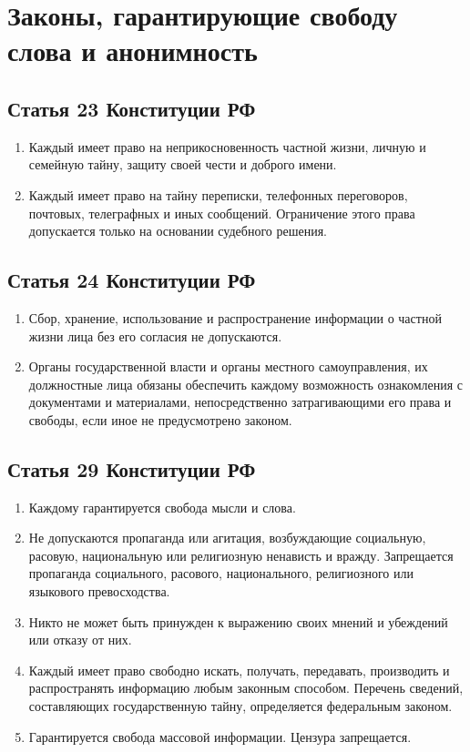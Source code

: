 \chapter{Законы, гарантирующие свободу слова и анонимность}
\section{Статья 23 Конституции РФ}
\begin{enumerate}
\item Каждый имеет право на неприкосновенность частной жизни, личную и семейную тайну, защиту своей чести и доброго имени.
\item Каждый имеет право на тайну переписки, телефонных переговоров, почтовых, телеграфных и иных сообщений. Ограничение этого права допускается только на основании судебного решения.
\end{enumerate}
\section{Статья 24 Конституции РФ}
\begin{enumerate}
\item Сбор, хранение, использование и распространение информации о частной жизни лица без его согласия не допускаются.
\item Органы государственной власти и органы местного самоуправления, их должностные лица обязаны обеспечить каждому возможность ознакомления с документами и материалами, непосредственно затрагивающими его права и свободы, если иное не предусмотрено законом.
\end{enumerate}
\section{Статья 29 Конституции РФ}
\begin{enumerate}
\item Каждому гарантируется свобода мысли и слова.
\item Не допускаются пропаганда или агитация, возбуждающие социальную, расовую, национальную или религиозную ненависть и вражду. Запрещается пропаганда социального, расового, национального, религиозного или языкового превосходства.
\item Никто не может быть принужден к выражению своих мнений и убеждений или отказу от них.
\item Каждый имеет право свободно искать, получать, передавать, производить и распространять информацию любым законным способом. Перечень сведений, составляющих государственную тайну, определяется федеральным законом.
\item Гарантируется свобода массовой информации. Цензура запрещается.
\end{enumerate}